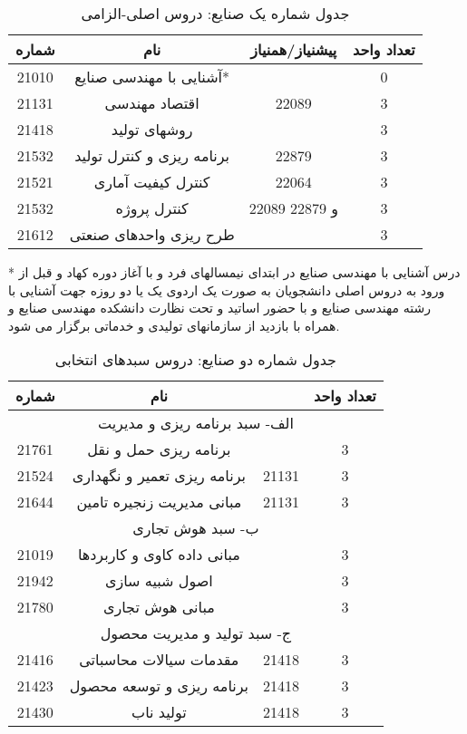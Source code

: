 \documentclass[class=article, crop=false]{standalone}
\begin{document}
	\begin{table}[H]
	\begin{center}
		\begin{tabular}{|c|c|c|c|}
			\hline
			شماره & نام & پیشنیاز/همنیاز & تعداد واحد \\
			\hline
			21010 & آشنایی با مهندسی صنایع* &  & 0 \\
			\hline
			21131 & اقتصاد مهندسی & 22089 & 3 \\
			\hline
			21418 & روشهای تولید &  & 3 \\
			\hline
			21532 & برنامه ریزی و کنترل تولید & 22879 & 3 \\
			\hline
			21521 & کنترل کیفیت آماری & 22064 & 3 \\
			\hline
			21532 & کنترل پروژه & 22089 و 22879 & 3 \\
			\hline
			21612 & طرح ریزی واحدهای صنعتی &  & 3 \\
			\hline
		\end{tabular}
		\caption{\label{ind-t1}
		جدول شماره یک صنایع: دروس اصلی-الزامی
		}
	\end{center}
\end{table}

	* درس آشنایی با مهندسی صنایع در ابتدای نیمسالهای فرد و با آغاز دوره کهاد و قبل از ورود به دروس اصلی دانشجویان به صورت یک اردوی یک یا دو روزه جهت آشنایی با رشته مهندسی صنایع و با حضور اساتید و تحت نظارت دانشکده مهندسی صنایع و همراه با بازدید از سازمانهای تولیدی و خدماتی برگزار می شود.
\begin{table}[H]
\begin{center}
		\begin{tabular}{|c|c|c|c|}
			\hline
			شماره & نام &  & تعداد واحد \\
			\hline
			\multicolumn{4}{|c|}{الف- سبد برنامه ریزی و مدیریت} \\
			\hline
			21761 & برنامه ریزی حمل و نقل &  & 3 \\
			\hline
			21524 & برنامه ریزی تعمیر و نگهداری & 21131 & 3 \\
			\hline
			21644 & مبانی مدیریت زنجیره تامین & 21131 & 3 \\
			\hline
			\multicolumn{4}{|c|}{ب- سبد هوش تجاری} \\
			\hline
			21019 & مبانی داده کاوی و کاربردها &  & 3 \\
			\hline
			21942 & اصول شبیه سازی &  & 3 \\
			\hline
			21780 & مبانی هوش تجاری &  & 3 \\
			\hline
			\multicolumn{4}{|c|}{ج- سبد تولید و مدیریت محصول} \\
			\hline
			21416 & مقدمات سیالات محاسباتی & 21418 & 3 \\
			\hline
			21423 & برنامه ریزی و توسعه محصول & 21418 & 3 \\
			\hline
			21430 & تولید ناب & 21418 & 3 \\
			\hline
		\end{tabular}
		\caption{\label{ind-t2}
		جدول شماره دو صنایع: دروس سبدهای انتخابی
		}
	\end{center}
\end{table}
\end{document}
